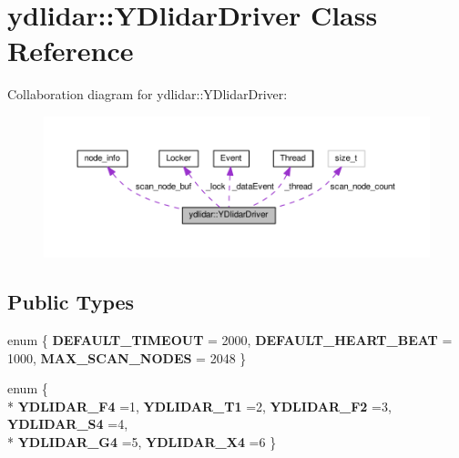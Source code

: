 \hypertarget{classydlidar_1_1_y_dlidar_driver}{}\section{ydlidar\+:\+:Y\+Dlidar\+Driver Class Reference}
\label{classydlidar_1_1_y_dlidar_driver}


Collaboration diagram for ydlidar\+:\+:Y\+Dlidar\+Driver\+:
\nopagebreak
\begin{figure}[H]
\begin{center}
\leavevmode
\includegraphics[width=350pt]{classydlidar_1_1_y_dlidar_driver__coll__graph}
\end{center}
\end{figure}
\subsection*{Public Types}
\begin{DoxyCompactItemize}
\item 
enum \{ {\bfseries D\+E\+F\+A\+U\+L\+T\+\_\+\+T\+I\+M\+E\+O\+UT} = 2000, 
{\bfseries D\+E\+F\+A\+U\+L\+T\+\_\+\+H\+E\+A\+R\+T\+\_\+\+B\+E\+AT} = 1000, 
{\bfseries M\+A\+X\+\_\+\+S\+C\+A\+N\+\_\+\+N\+O\+D\+ES} = 2048
 \}\hypertarget{classydlidar_1_1_y_dlidar_driver_a13a4f2dc4067b43794b2c47c06d5d27a}{}\label{classydlidar_1_1_y_dlidar_driver_a13a4f2dc4067b43794b2c47c06d5d27a}

\item 
enum \{ \\*
{\bfseries Y\+D\+L\+I\+D\+A\+R\+\_\+\+F4} =1, 
{\bfseries Y\+D\+L\+I\+D\+A\+R\+\_\+\+T1} =2, 
{\bfseries Y\+D\+L\+I\+D\+A\+R\+\_\+\+F2} =3, 
{\bfseries Y\+D\+L\+I\+D\+A\+R\+\_\+\+S4} =4, 
\\*
{\bfseries Y\+D\+L\+I\+D\+A\+R\+\_\+\+G4} =5, 
{\bfseries Y\+D\+L\+I\+D\+A\+R\+\_\+\+X4} =6
 \}\hypertarget{classydlidar_1_1_y_dlidar_driver_abbb612f1ac6a9f6dfdcfeafb149dd0da}{}\label{classydlidar_1_1_y_dlidar_driver_abbb612f1ac6a9f6dfdcfeafb149dd0da}

\end{DoxyCompactItemize}
